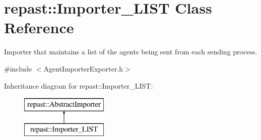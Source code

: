 \hypertarget{classrepast_1_1_importer___l_i_s_t}{\section{repast\-:\-:Importer\-\_\-\-L\-I\-S\-T Class Reference}
\label{classrepast_1_1_importer___l_i_s_t}
}


Importer that maintains a list of the agents being sent from each sending process.  




{\ttfamily \#include $<$Agent\-Importer\-Exporter.\-h$>$}

Inheritance diagram for repast\-:\-:Importer\-\_\-\-L\-I\-S\-T\-:\begin{figure}[H]
\begin{center}
\leavevmode
\includegraphics[height=2.000000cm]{classrepast_1_1_importer___l_i_s_t}
\end{center}
\end{figure}
